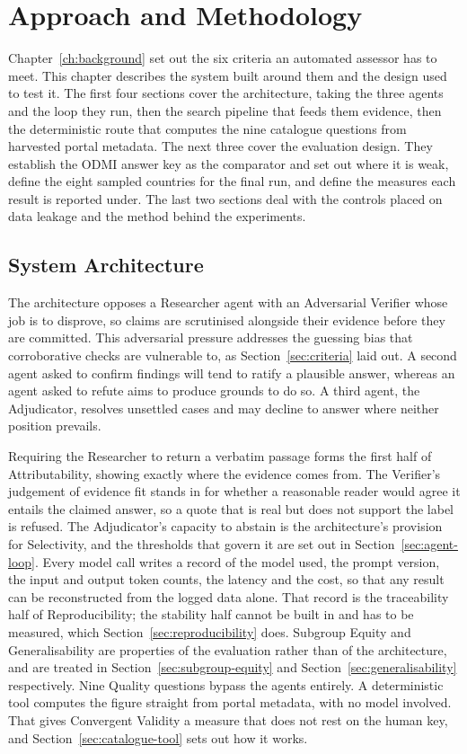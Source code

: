 \chapter{Approach and Methodology}\label{ch:methodology}

Chapter~\ref{ch:background} set out the six criteria an automated assessor has to meet. This chapter describes the system built around them and the design used to test it. The first four sections cover the architecture, taking the three agents and the loop they run, then the search pipeline that feeds them evidence, then the deterministic route that computes the nine catalogue questions from harvested portal metadata. The next three cover the evaluation design. They establish the ODMI answer key as the comparator and set out where it is weak, define the eight sampled countries for the final run, and define the measures each result is reported under. The last two sections deal with the controls placed on data leakage and the method behind the experiments.

\section{System Architecture}\label{sec:architecture}

The architecture opposes a Researcher agent with an Adversarial Verifier whose job is to disprove, so claims are scrutinised alongside their evidence before they are committed. This adversarial pressure addresses the guessing bias that corroborative checks are vulnerable to, as Section~\ref{sec:criteria} laid out. A second agent asked to confirm findings will tend to ratify a plausible answer, whereas an agent asked to refute aims to produce grounds to do so. A third agent, the Adjudicator, resolves unsettled cases and may decline to answer where neither position prevails.

Requiring the Researcher to return a verbatim passage forms the first half of Attributability, showing exactly where the evidence comes from. The Verifier's judgement of evidence fit stands in for whether a reasonable reader would agree it entails the claimed answer, so a quote that is real but does not support the label is refused. The Adjudicator's capacity to abstain is the architecture's provision for Selectivity, and the thresholds that govern it are set out in Section~\ref{sec:agent-loop}. Every model call writes a record of the model used, the prompt version, the input and output token counts, the latency and the cost, so that any result can be reconstructed from the logged data alone. That record is the traceability half of Reproducibility; the stability half cannot be built in and has to be measured, which Section~\ref{sec:reproducibility} does. Subgroup Equity and Generalisability are properties of the evaluation rather than of the architecture, and are treated in Section~\ref{sec:subgroup-equity} and Section~\ref{sec:generalisability} respectively. Nine Quality questions bypass the agents entirely. A deterministic tool computes the figure straight from portal metadata, with no model involved. That gives Convergent Validity a measure that does not rest on the human key, and Section~\ref{sec:catalogue-tool} sets out how it works.

